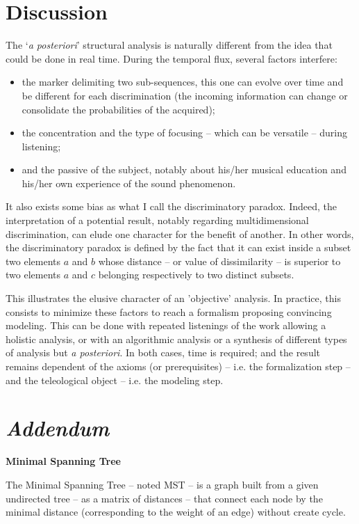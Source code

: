 \section{Discussion}
The `\textit{a posteriori}' structural analysis is naturally different from the idea that could be done in real time. During the temporal flux, several factors interfere:
\begin{itemize}
  \item the marker delimiting two sub-sequences, this one can evolve over time and be different for each discrimination (the incoming information can change or consolidate the probabilities of the acquired);
  \item the concentration and the type of focusing -- which can be versatile -- during listening;
  \item and the passive of the subject, notably about his/her musical education and his/her own experience of the sound phenomenon.
\end{itemize}

It also exists some bias as what I call the discriminatory paradox. Indeed, the interpretation of a potential result, notably regarding multidimensional discrimination, can elude one character for the benefit of another. In other words, the discriminatory paradox is defined by the fact that it can exist inside a subset two elements $a$ and $b$ whose distance -- or value of dissimilarity -- is superior to two elements $a$ and $c$ belonging respectively to two distinct subsets.

\bigskip

This illustrates the elusive character of an 'objective' analysis. In practice, this consists to minimize these factors to reach a formalism proposing convincing modeling. This can be done with repeated listenings of the work allowing a holistic analysis, or with an algorithmic analysis or a synthesis of different types of analysis but \textit{a posteriori}. In both cases, time is required; and the result remains dependent of the axioms (or prerequisites) -- i.e. the formalization step -- and the teleological object -- i.e. the modeling step.

\section{\textit{Addendum}}

\textbf{Minimal Spanning Tree}
\smallskip

The Minimal Spanning Tree -- noted MST -- is a graph built from a given undirected tree -- as a matrix of distances -- that connect each node by the minimal distance (corresponding to the weight of an edge) without create cycle. 

